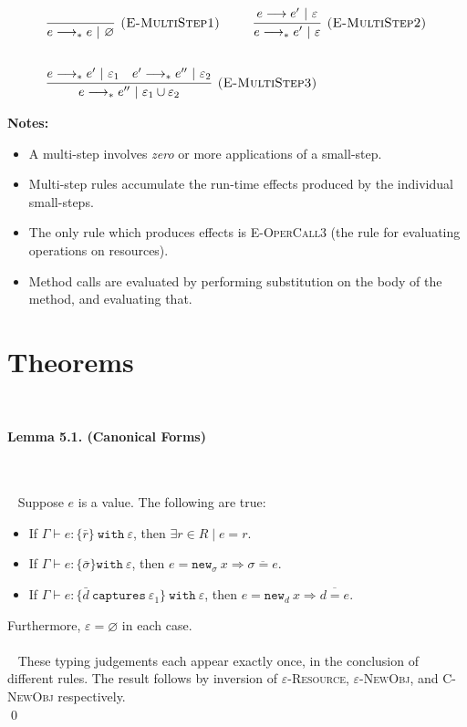 \documentclass{llncs}
\newcommand{\keywadj}[1]{\mathtt{#1}}
\newcommand{\keyw}[1]{\keywadj{#1}~}
\newcommand{\thm}[3]{
	\begin{large}
		\bf{#1}
	\end{large} \\\\
	\fbox{Statement.} ~ #2
	\fbox{Proof.}~ #3 \qed
}
\begin{document}
\[
\begin{array}{lll}

	\infer[\textsc{(E-MultiStep1)}]
	{e \longrightarrow_* e~|~\varnothing}
	{} ~~~~~~~~
	
	\infer[\textsc{(E-MultiStep2)}]
	{e \longrightarrow_* e'~|~\varepsilon}
	{e \longrightarrow e'~|~\varepsilon} \\[5ex]

	\infer[\textsc{(E-MultiStep3)}]
	{e \longrightarrow_* e''~|~\varepsilon_1 \cup \varepsilon_2}
	{e \longrightarrow_* e'~|~\varepsilon_1 & e' \longrightarrow_* e''~|~\varepsilon_2}

\end{array}
\]

\noindent \textbf{Notes:}
\begin{itemize}
	\item A multi-step involves \textit{zero} or more applications of a small-step.
	\item Multi-step rules accumulate the run-time effects produced by the individual small-steps.
	\item The only rule which produces effects is \textsc{E-OperCall3} (the rule for evaluating operations on resources).
	\item Method calls are evaluated by performing substitution on the body of the method, and evaluating that.
\end{itemize}

\newpage

\newpage

\section{Theorems}

\ 
\thm{Lemma 5.1. (Canonical Forms)}
{Suppose $e$ is a value. The following are true:
	\begin{itemize}
	\item If $\Gamma \vdash e : \{ \bar r \}~\keyw{with} \varepsilon$, then $\exists r \in R \mid e = r$.
	\item If $\Gamma \vdash e : \{ \bar \sigma \} \keyw{with} \varepsilon$, then $e = \keywadj{new}_{\sigma}~x \Rightarrow \overline{\sigma = e}$.
	\item If $\Gamma \vdash e : \{ \bar d~\keyw{captures} \varepsilon_1 \}~ \keyw{with} \varepsilon$, then $e = \keywadj{new}_{d}~x \Rightarrow \overline{ d = e }$.
	\end{itemize}
Furthermore, $\varepsilon = \varnothing$ in each case. \\\\
}
{ These typing judgements each appear exactly once, in the conclusion of different rules. The result follows by inversion of \textsc{$\varepsilon$-Resource}, \textsc{$\varepsilon$-NewObj}, and \textsc{C-NewObj} respectively. \\
}
\end{document}
